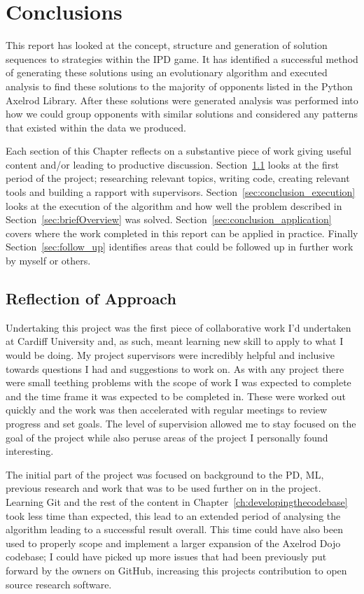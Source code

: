 \chapter{Conclusions}\label{ch:conclusions}
This report has looked at the concept, structure and generation of solution sequences to strategies within the IPD game. 
It has identified a successful method of generating these solutions using an evolutionary algorithm and executed analysis to find these solutions to the majority of opponents listed in the Python Axelrod Library. 
After these solutions were generated analysis was performed into how we could group opponents with similar solutions and considered any patterns that existed within the data we produced.

Each section of this Chapter reflects on a substantive piece of work giving useful content and/or leading to productive discussion.
Section~\ref{sec:conclusion_approach} looks at the first period of the project; researching relevant topics,  writing code, creating relevant tools and building a rapport with supervisors.
Section~\ref{sec:conclusion_execution} looks at the execution of the algorithm and how well the problem described in Section~\ref{sec:briefOverview} was solved.
Section~\ref{sec:conclusion_application} covers where the work completed in this report can be applied in practice.
Finally Section~\ref{sec:follow_up} identifies areas that could be followed up in further work by myself or others.

\section{Reflection of Approach}\label{sec:conclusion_approach}
Undertaking this project was the first piece of collaborative work I'd undertaken at Cardiff University and, as such, meant learning new skill to apply to what I would be doing.
My project supervisors were incredibly helpful and inclusive towards questions I had and suggestions to work on.
As with any project there were small teething problems with the scope of work I was expected to complete and the time frame it was expected to be completed in.
These were worked out quickly and the work was then accelerated with regular meetings to review progress and set goals.
The level of supervision allowed me to stay focused on the goal of the project while also peruse areas of the project I personally found interesting.

The initial part of the project was focused on background to the PD, ML, previous research and work that was to be used further on in the project. 
Learning Git and the rest of the content in Chapter~\ref{ch:developingthecodebase} took less time than expected, this lead to an extended period of analysing the algorithm leading to a successful result overall. 
This time could have also been used to properly scope and implement a larger expansion of the Axelrod Dojo codebase; I could have picked up more issues that had been previously put forward by the owners on GitHub, increasing this projects contribution to open source research software.

